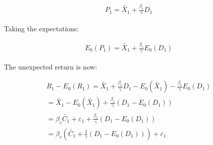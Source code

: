 \begin{equation}
    \begin{aligned}
    P_1 = \tilde{X_1} + \frac{\beta_{c}}{\gamma}D_1
    \end{aligned}
\end{equation}

Taking the expectations:

\begin{equation}
    \begin{aligned}
    E_0(P_1) = \tilde{X_1} + \frac{\beta_{c}}{\gamma}E_0(D_1) 
    \end{aligned}
\end{equation}

The unexpected return is now:

\begin{equation}
    \begin{aligned}
    R_1 - E_0(R_1) = \tilde{X_1} + \frac{\beta_{c}}{\gamma}D_1 - E_0(\tilde{X_1}) - \frac{\beta_{c}}{\gamma}E_0(D_1) \\
    = \tilde{X_1} - E_0(\tilde{X_1}) + \frac{\beta_{c}}{\gamma}(D_1 - E_0(D_1)) \\
    = \beta_{c} \tilde{C_1} + \varepsilon_1 + \frac{\beta_{c}}{\gamma}(D_1 - E_0(D_1)) \\
    = \beta_{c}(\tilde{C_1} + \frac{1}{\gamma}(D_1 - E_0(D_1))) + \varepsilon_1
    \end{aligned}
\end{equation}

